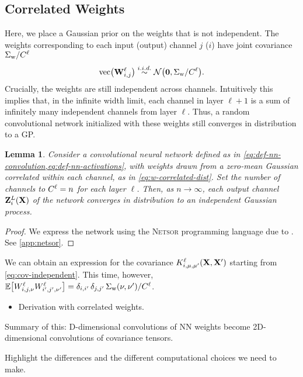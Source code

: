 \documentclass{article}
\newtheorem{lemma}{Lemma}
\newcommand{\vecfun}{\text{vec}\bra}
\newcommand{\simiid}{\overset{i.i.d.}{\sim}}
\begin{document}
\subsection{Correlated Weights}
Here, we place a Gaussian prior on the weights that is not independent. The weights
corresponding to each input (output) channel $j$ ($i$) have joint covariance
$\Sigma_\text{w}/C^{\ell}$
\begin{equation}
  \vecfun{\vW\ssup{\ell}_{i,j}} \simiid \NormDist{\boldsymbol{0}, \Sigma_\text{w}/C\ssup{\ell}}.
  \label{eq:w-correlated-dist}
\end{equation}
Crucially, the weights are still independent across channels. Intuitively this
implies that, in the infinite width limit, each channel in layer $\ell+1$ is a
sum of infinitely many independent channels from layer $\ell$. Thus, a random
convolutional network initialized with these weights still converges in distribution
to a GP.

\begin{lemma}
  Consider a convolutional neural network defined as in
  \cref{eq:def-nn-convolution,eq:def-nn-activations}, with weights drawn from a
  zero-mean Gaussian correlated within each channel, as in \cref{eq:w-correlated-dist}.
  Set the number of channels to $C^{\ell} = n$ for each layer $\ell$. Then,
  as $n\to \infty$, each output channel $\mathbf{Z}^{L}_i(\mathbf{X})$ of the network converges in
  distribution to an independent Gaussian process.
\end{lemma}
\begin{proof}
  We express the network using the \textsc{Netsor} programming language due to
  \citet{yang2019wide}. See \cref{app:netsor}.
\end{proof}

We can obtain an expression for the covariance $K^{\ell}_{i,\mu,\mu'}(\mathbf{X},
\mathbf{X}')$ starting from \cref{eq:cov-independent}. This time, however,
$\ExpSymb\sqb{W\ssup{\ell}_{i,j,\nu}W\ssup{\ell}_{i',j',\nu'}} = \delta_{i,i'} \, \delta_{j, j'} \, \Sigma_{\text{w}}\bra{\nu,\nu'}/C\ssup{\ell}$.

  
\begin{itemize}
    \item Derivation with correlated weights.
\end{itemize}
Summary of this: D-dimensional convolutions of NN weights become 2D-dimensional convolutions of covariance tensors. 

Highlight the differences and the different computational choices we need to make.
\end{document}
